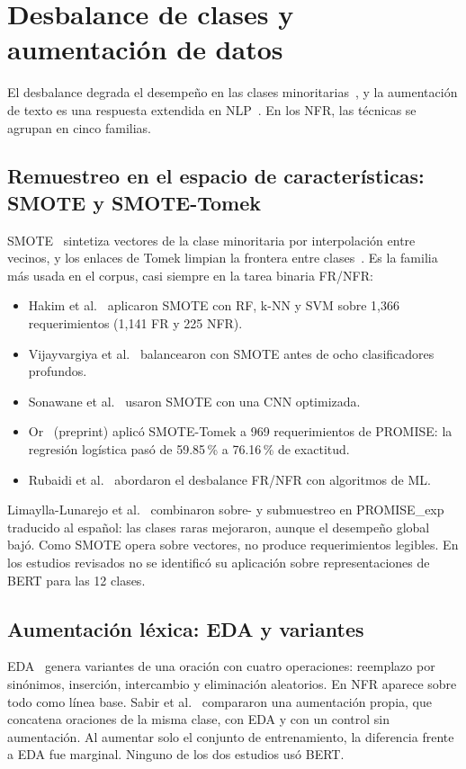 \documentclass[conference]{IEEEtran}
\begin{document}
\section{Desbalance de clases y aumentación de datos}\label{sec:aumentacion}
El desbalance degrada el desempeño en las clases minoritarias~\cite{Johnson2019-Imbalance}, y la aumentación de texto es una respuesta extendida en NLP~\cite{Feng2021-DASurvey,Bayer2022-DASurvey}. En los NFR, las técnicas se agrupan en cinco familias.

\subsection{Remuestreo en el espacio de características: SMOTE y SMOTE-Tomek}
SMOTE~\cite{Chawla2002-SMOTE} sintetiza vectores de la clase minoritaria por interpolación entre vecinos, y los enlaces de Tomek limpian la frontera entre clases~\cite{Batista2004-SMOTETomek}. Es la familia más usada en el corpus, casi siempre en la tarea binaria FR/NFR:
\begin{itemize}
  \item Hakim et al.~\cite{Hakim2018-Oversampling} aplicaron SMOTE con RF, k-NN y SVM sobre 1,366 requerimientos (1,141 FR y 225 NFR).
  \item Vijayvargiya et al.~\cite{Vijayvargiya2022-Software} balancearon con SMOTE antes de ocho clasificadores profundos.
  \item Sonawane et al.~\cite{Sonawane2025-Classification} usaron SMOTE con una CNN optimizada.
  \item Or~\cite{Or2025-SMOTETomek} (preprint) aplicó SMOTE-Tomek a 969 requerimientos de PROMISE: la regresión logística pasó de 59.85\,\% a 76.16\,\% de exactitud.
  \item Rubaidi et al.~\cite{Rubaidi2023-SMOTETomek} abordaron el desbalance FR/NFR con algoritmos de ML.
\end{itemize}
Limaylla-Lunarejo et al.~\cite{Limaylla2025-Spanish} combinaron sobre- y submuestreo en PROMISE\_exp traducido al español: las clases raras mejoraron, aunque el desempeño global bajó. Como SMOTE opera sobre vectores, no produce requerimientos legibles. En los estudios revisados no se identificó su aplicación sobre representaciones de BERT para las 12 clases.

\subsection{Aumentación léxica: EDA y variantes}
EDA~\cite{Wei2019-EDA} genera variantes de una oración con cuatro operaciones: reemplazo por sinónimos, inserción, intercambio y eliminación aleatorios. En NFR aparece sobre todo como línea base. Sabir et al.~\cite{Sabir2021-DeepLearning,Sabir2022-Custom} compararon una aumentación propia, que concatena oraciones de la misma clase, con EDA y con un control sin aumentación. Al aumentar solo el conjunto de entrenamiento, la diferencia frente a EDA fue marginal. Ninguno de los dos estudios usó BERT.
\end{document}
